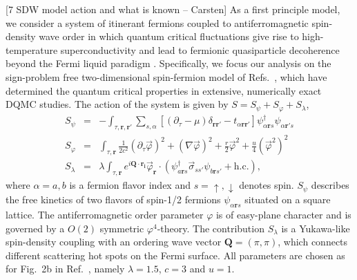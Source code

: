 \documentclass[amsmath,amssymb, aps, prx, longbibliography, twocolumn]{revtex4-1}
\begin{document}
[7 SDW model action and what is known -- Carsten]
As a first principle model, we consider a system of itinerant fermions coupled to antiferromagnetic spin-density wave order in which quantum critical fluctuations give rise to high-temperature superconductivity and lead to fermionic quasiparticle decoherence beyond the Fermi liquid paradigm \cite{Bauer2020, Schattner2016, Gerlach2017, Liu2018}.
Specifically, we focus our analysis on the sign-problem free \cite{Berg2012, Wu2005} two-dimensional spin-fermion model of Refs.~\cite{Schattner2016, Gerlach2017, Zhang2019}, which have determined the quantum critical properties in extensive, numerically exact DQMC studies. The action of the system is given by $S = S_\psi + S_\varphi + S_\lambda$,
\begin{eqnarray}
\label{Eq:SDW}
S_\psi &=&  - \int_{\tau, \mathbf{r}, \mathbf{r'}} \sum_{s, \alpha} \left[ \left(\partial_\tau - \mu\right)\delta_{\mathbf{r}\mathbf{r'}} - t_{\alpha \mathbf{r}\mathbf{r'}} \right] \psi_{\alpha \mathbf{r}s}^\dagger \psi_{\alpha \mathbf{r'}s} \nonumber\\
S_\varphi &=& \int_{\tau,\mathbf{r}} \frac{1}{2c^2} \left(\partial_\tau \vec{\varphi}\right)^2 + \left(\nabla \vec{\varphi} \right)^2 + \frac{r}{2}\vec \varphi^2 + \frac{u}{4} (\vec \varphi^2)^2 \label{eq:afmetal}\\
S_\lambda &=& \lambda \int_{\tau, \mathbf{r}} e^{i \mathbf{Q}\cdot \mathbf{r_i}} \vec{\varphi}_\mathbf{r} \cdot \left( \psi_{a\mathbf{r}s}^\dagger \vec{\sigma}_{ss'}  \psi_{b\mathbf{r}s'} + \textrm{h.c.} \right), \nonumber
\end{eqnarray}
where $\alpha=a,b$ is a fermion flavor index and $s=\uparrow, \downarrow$ denotes spin. $S_\psi$ describes the free kinetics of two flavors of spin-1/2 fermions $\psi_{\alpha \mathbf{r} s}$ situated on a square lattice. The antiferromagnetic order parameter $\varphi$ is of easy-plane character and is governed by a $O(2)$ symmetric $\varphi^4$-theory. The contribution $S_\lambda$ is a Yukawa-like spin-density coupling with an ordering wave vector $\mathbf{Q} = (\pi,\pi)$, which connects different scattering hot spots on the Fermi surface. All parameters are chosen as for Fig.~2b in Ref.~\cite{Gerlach2017}, namely $\lambda=1.5$, $c=3$ and $u=1$.
\end{document}
